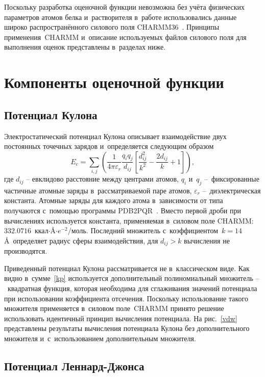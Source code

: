 Поскольку разработка оценочной функции невозможна без учёта физических параметров атомов белка и~растворителя в~работе использовались данные широко распространённого силового поля CHARMM36~\cite{brooks}. Принципы применения~CHARMM и~описание используемых файлов силового поля для выполнения оценок представлены в~разделах ниже.


\section{Компоненты оценочной функции}

\subsection{Потенциал Кулона}

Электростатический потенциал Кулона описывает взаимодействие двух постоянных точечных зарядов и~определяется следующим образом
\begin{equation}
	E_{c}=\sum_{i,j}\left({\frac{1}{4 \pi \varepsilon_{r}}} \frac{q_{i}q_{j}}{d_{ij}} \left[ \frac{d^{2}_{ij}}{k^{2}} - \frac{2 d_{ij}}{k} + 1 \right]\right),
	\label{kp}
\end{equation}
где $d_{ij}$ -- евклидово расстояние между центрами атомов, $q_{i}$ и~$q_{j}$ --~фиксированные частичные атомные заряды в~рассматриваемой паре атомов, $\varepsilon_{r}$ --~диэлектрическая константа. Атомные заряды для каждого атома в~зависимости от типа получаются с~помощью программы PDB2PQR~\cite{pdb2pqr}. Вместо первой дроби при вычислениях используется константа, применяемая в~силовом поле CHARMM: $332.0716$~ккал${\cdot}$\AA${\cdot}e^{-2}/$моль. Последний множитель с~коэффициентом~$k=14$\AA \ определяет радиус сферы взаимодействия, для $d_{ij} > k$ вычисления не производятся.

Приведенный потенциал Кулона рассматривается не в~классическом виде. Как видно в~сумме~\ref{kp} используется дополнительный полиномиальный множитель --~квадратная функция, которая необходима для сглаживания значений потенциала при использовании коэффициента отсечения. Поскольку использование такого множителя применяется в~силовом поле~CHARMM принято решение использовать идентичный принцип вычисления потенциала. На рис.~\ref{vdw} представлены результаты вычисления потенциала Кулона без дополнительного множителя и~с~использованием дополнительным множителя.

\subsection{Потенциал Леннард-Джонса}

